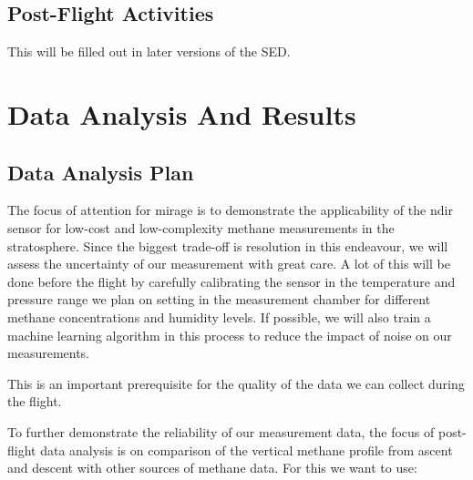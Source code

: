 \documentclass[12pt,a4paper]{report}
\begin{document}
\clearpage

\section{Post-Flight Activities}
This will be filled out in later versions of the SED.


\chapter{Data Analysis And Results}

\section{Data Analysis Plan}

The focus of attention for \ac{mirage} is to demonstrate the applicability of the \ac{ndir} sensor for low-cost and low-complexity methane measurements in the stratosphere. Since the biggest trade-off is resolution in this endeavour, we will assess the uncertainty of our measurement with great care. A lot of this will be done before the flight by carefully calibrating the sensor in the temperature and pressure range we plan on setting in the measurement chamber for different methane concentrations and humidity levels. If possible, we will also train a machine learning algorithm in this process to reduce the impact of noise on our measurements.

This is an important prerequisite for the quality of the data we can collect during the flight.

To further demonstrate the reliability of our measurement data, the focus of post-flight data analysis is on comparison of the vertical methane profile from ascent and descent with other sources of methane data. For this we want to use:
\end{document}
